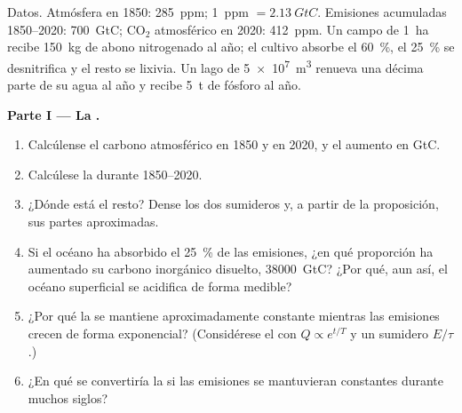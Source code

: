 \begin{problem}
\label{pb:b2:biogeochemical-cycles:1}
Datos. Atmósfera en 1850: \qty{285}{ppm}; \qty{1}{ppm} $=
\qty{2.13}{GtC}$. Emisiones acumuladas 1850--2020: \qty{700}{GtC};
$\mathrm{CO_2}$ atmosférico en 2020: \qty{412}{ppm}. Un campo de
\qty{1}{ha} recibe \qty{150}{kg} de abono nitrogenado al año; el cultivo
absorbe el \qty{60}{\%}, el \qty{25}{\%} se desnitrifica y el resto se
lixivia. Un lago de \qty{5e7}{m^3} renueva una décima parte de su agua al
año y recibe \qty{5}{t} de fósforo al año.

\medskip
\noindent\textbf{Parte I --- La .}
\begin{enumerate}
  \item Calcúlense el carbono atmosférico en 1850 y en 2020, y el aumento
        en GtC.
  \item Calcúlese la  durante 1850--2020.
  \item ¿Dónde está el resto? Dense los dos sumideros y, a partir de la
        proposición, sus partes aproximadas.
  \item Si el océano ha absorbido el \qty{25}{\%} de las emisiones, ¿en
        qué proporción ha aumentado su carbono inorgánico disuelto,
        \qty{38000}{GtC}? ¿Por qué, aun así, el océano superficial se
        acidifica de forma medible?
  \item ¿Por qué la  se mantiene aproximadamente
        constante mientras las emisiones crecen de forma exponencial?
        (Considérese el  con
        $Q \propto e^{t/T}$ y un sumidero $E/\tau$.)
  \item ¿En qué se convertiría la  si las emisiones se
        mantuvieran constantes durante muchos siglos?
\end{enumerate}


\end{problem}
